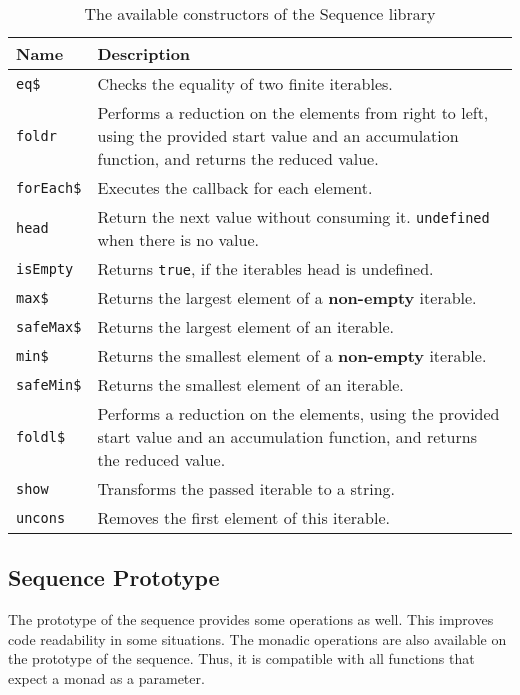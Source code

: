 \begin{table}[H]
  \centering
  \begin{tabularx}{\textwidth}{| l | X |} \hline
    \textbf{Name} & \textbf{Description} \\ \hline
    \texttt{eq\$} & Checks the equality of two finite iterables. \\ \hline 
    \texttt{foldr} & Performs a reduction on the elements from right to left, using the provided start value and an accumulation function, and returns the reduced value. \\ \hline 
    \texttt{forEach\$} & Executes the callback for each element. \\ \hline 
    \texttt{head} & Return the next value without consuming it. \texttt{undefined} when there is no value. \\ \hline 
    \texttt{isEmpty} & Returns \texttt{true}, if the iterables head is undefined. \\ \hline 
    \texttt{max\$} & Returns the largest element of a \textbf{non-empty} iterable. \\ \hline 
    \texttt{safeMax\$} & Returns the largest element of an iterable. \\ \hline 
    \texttt{min\$} & Returns the smallest element of a \textbf{non-empty} iterable. \\ \hline 
    \texttt{safeMin\$} & Returns the smallest element of an iterable. \\ \hline 
    \texttt{foldl\$} & Performs a reduction on the elements, using the provided start value and an accumulation function, and returns the reduced value. \\ \hline 
    \texttt{show} & Transforms the passed iterable to a string. \\ \hline 
    \texttt{uncons} & Removes the first element of this iterable. \\ \hline 
  \end{tabularx}
  \caption{The available constructors of the Sequence library}
  \label{tab:api_term_ops}
\end{table}

\subsection{Sequence Prototype} %
\label{sub:Sequence Prototype}
The prototype of the sequence provides some operations as well. This improves
code readability in some situations. The monadic operations are also available
on the prototype of the sequence. Thus, it is compatible with all functions
that expect a monad as a parameter.

